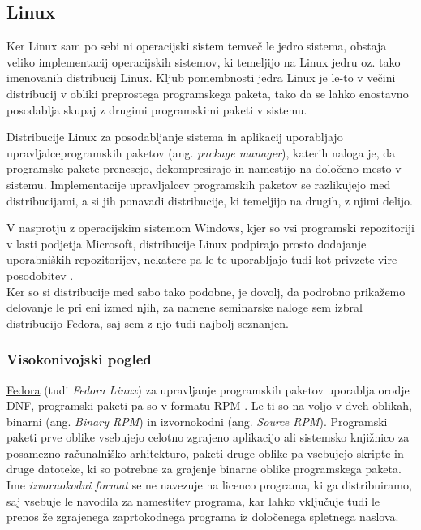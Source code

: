 \subsection{Linux}

Ker Linux sam po sebi ni operacijski sistem temveč le jedro sistema, obstaja veliko implementacij operacijskih sistemov,
ki temeljijo na Linux jedru oz. tako imenovanih distribucij Linux.
Kljub pomembnosti jedra Linux je le-to v večini distribucij v obliki preprostega programskega paketa,
tako da se lahko enostavno posodablja skupaj z drugimi programskimi paketi v sistemu.

Distribucije Linux za posodabljanje sistema in aplikacij uporabljajo upravljalce\linebreak programskih paketov
(ang. \emph{package manager}), katerih naloga je, da programske pakete prenesejo,
dekompresirajo in namestijo na določeno mesto v sistemu.
Implementacije upravljalcev programskih paketov se razlikujejo med distribucijami,
a si jih ponavadi distribucije, ki temeljijo na drugih, z njimi delijo.

V nasprotju z operacijskim sistemom Windows, kjer so vsi programski repozitoriji v lasti podjetja Microsoft,
distribucije Linux podpirajo prosto dodajanje uporabniških repozitorijev, nekatere pa le-te uporabljajo tudi
kot privzete vire posodobitev \cite{arch-mirrors}.\\

Ker so si distribucije med sabo tako podobne, je dovolj, da podrobno prikažemo delovanje le pri eni izmed njih, za
namene seminarske naloge sem izbral distribucijo Fedora, saj sem z njo tudi najbolj seznanjen.

\subsubsection{Visokonivojski pogled}

\href{https://getfedora.org/}{Fedora} (tudi \emph{Fedora Linux}) za upravljanje programskih paketov uporablja
orodje DNF, programski paketi pa so v formatu RPM \cite{rpm}.
Le-ti so na voljo v dveh oblikah, binarni (ang. \emph{Binary RPM}) in izvornokodni (ang. \emph{Source RPM}).
Programski paketi prve oblike vsebujejo celotno zgrajeno aplikacijo ali sistemsko knjižnico za posamezno
računalniško arhitekturo, paketi druge oblike pa vsebujejo skripte in druge datoteke, ki so potrebne za grajenje
binarne oblike programskega paketa.
Ime \emph{izvornokodni format} se ne navezuje na licenco programa, ki ga distribuiramo, saj vsebuje le navodila
za namestitev programa, kar lahko vključuje tudi le prenos že zgrajenega zaprtokodnega programa
iz določenega spletnega naslova.

